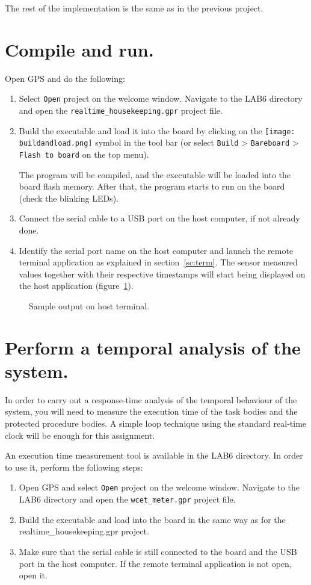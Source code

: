 The rest of the implementation is the same as in the previous project.

\section{Compile and run.}

Open GPS and do the following:
\begin{enumerate}
\item Select {\tt Open} project on the welcome window. Navigate to the LAB6 directory and open the {\tt realtime\_housekeeping.gpr} project file.
\item Build the executable and load it into the board by clicking on the \hbox{\texttt{[image: buildandload.png]}} symbol in the tool bar (or select {\tt Build} > {\tt Bareboard} > {\tt Flash to board} on the top menu).

The program will be compiled, and the executable will be loaded into the board flash memory. After that, the program starts to run on the board (check the blinking LEDs).
\item Connect the serial cable to a USB port on the host computer, if not already done.
\item Identify the serial port name on the host computer and launch the remote terminal application as explained in section~\ref{sc:term}.  The sensor measured values together with their respective timestamps will start being displayed on the host application (figure~\ref{fig:output}).
\end{enumerate}

\begin{figure}[h]
            \caption{Sample output on host terminal.}
            \label{fig:output}
\end{figure}

\section{Perform a temporal analysis of the system.}\label{sc:ta}

In order to carry out a response-time analysis of the temporal behaviour of the system, you will need to measure the execution time of the task bodies and the protected procedure bodies. A simple loop technique using the standard real-time clock will be enough for this assignment.

An execution time measurement tool is available in the LAB6 directory. In order to use it, perform the following steps:
\begin{enumerate}
\item Open GPS and select {\tt Open} project on the welcome window. Navigate to the LAB6 directory and open the {\tt wcet\_meter.gpr} project file.
\item Build the executable and load into the board in the same way as for the realtime\_housekeeping.gpr project.
\item Make sure that the serial cable is still connected to the board and the USB port in the host computer. If the remote terminal application is not open, open it.
\end{enumerate}

